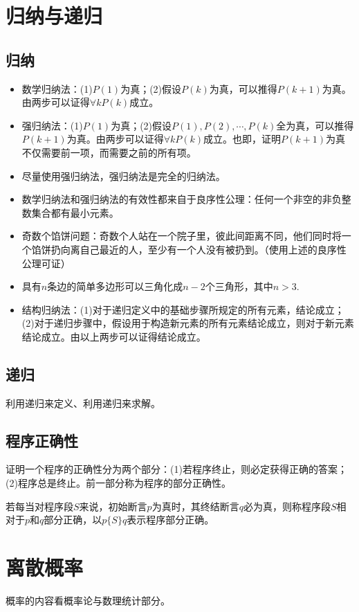 \section{归纳与递归}
\subsection{归纳}
\begin{itemize}
    \item 数学归纳法：(1)$P(1)$为真；(2)假设$P(k)$为真，可以推得$P(k+1)$为真。由两步可以证得$\forall k P(k)$成立。
    \item 强归纳法：(1)$P(1)$为真；(2)假设$P(1), P(2), \cdots, P(k)$全为真，可以推得$P(k+1)$为真。由两步可以证得$\forall k P(k)$成立。也即，证明$P(k+1)$为真不仅需要前一项，而需要之前的所有项。
    \item 尽量使用强归纳法，强归纳法是完全的归纳法。
    \item 数学归纳法和强归纳法的有效性都来自于良序性公理：任何一个非空的非负整数集合都有最小元素。
    \item 奇数个馅饼问题：奇数个人站在一个院子里，彼此间距离不同，他们同时将一个馅饼扔向离自己最近的人，至少有一个人没有被扔到。（使用上述的良序性公理可证）
    \item 具有$n$条边的简单多边形可以三角化成$n-2$个三角形，其中$n > 3$.
    \item 结构归纳法：(1)对于递归定义中的基础步骤所规定的所有元素，结论成立；(2)对于递归步骤中，假设用于构造新元素的所有元素结论成立，则对于新元素结论成立。由以上两步可以证得结论成立。
\end{itemize}

\subsection{递归}
利用递归来定义、利用递归来求解。

\subsection{程序正确性}
证明一个程序的正确性分为两个部分：(1)若程序终止，则必定获得正确的答案；(2)程序总是终止。前一部分称为程序的部分正确性。

若每当对程序段$S$来说，初始断言$p$为真时，其终结断言$q$必为真，则称程序段$S$相对于$p$和$q$部分正确，以$p \{ S \} q$表示程序部分正确。

\section{离散概率}
概率的内容看概率论与数理统计部分。

